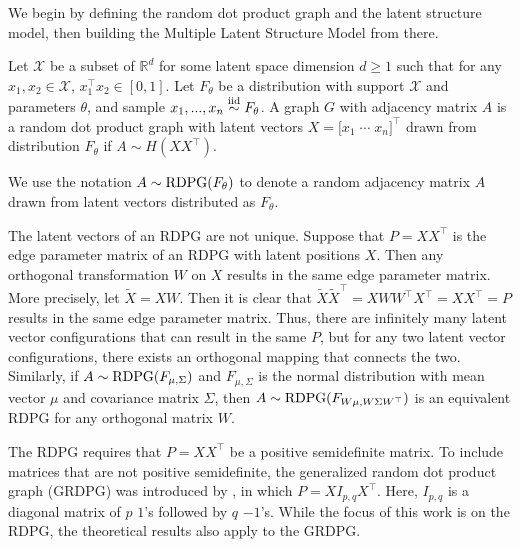 \documentclass[12pt]{article}
\begin{document}
We begin by defining the random dot product graph and the latent
structure model, then building the Multiple Latent Structure Model from
there.

\begin{definition}
\label{def:rdpg}
Let $\mathcal{X}$ be a subset of $\mathbb{R}^d$ for some latent space dimension $d \geq 1$ such that for any $x_1, x_2 \in \mathcal{X}$, $x_1^\top x_2 \in [0, 1]$. 
Let $F_\theta$ be a distribution with support $\mathcal{X}$ and parameters $\theta$, and sample $x_1, ..., x_n \stackrel{\mathrm{iid}}{\sim} F_\theta$. 
A graph $G$ with adjacency matrix $A$ is a random dot product graph with latent vectors $X = \bigl[x_1 \; \cdots \; x_n\bigr]^\top$ drawn from distribution $F_\theta$ if $A \sim H(X X^\top)$. 

We use the notation $A \sim \mathrm{RDPG}(F_\theta)$ to denote a random adjacency matrix $A$ drawn from latent vectors distributed as $F_\theta$. 
\end{definition}

\begin{remark}
\label{remark:nonunique}
The latent vectors of an RDPG are not unique. 
Suppose that $P = X X^\top$ is the edge parameter matrix of an RDPG with latent positions $X$. 
Then any orthogonal transformation $W$ on $X$ results in the same edge parameter matrix. 
More precisely, let $\tilde{X} = X W$. 
Then it is clear that $\tilde{X} \tilde{X}^\top = X W W^\top X^\top = X X^\top = P$ results in the same edge parameter matrix. 
Thus, there are infinitely many latent vector configurations that can result in the same $P$, but for any two latent vector configurations, there exists an orthogonal mapping that connects the two. 
Similarly, if $A \sim \mathrm{RDPG}(F_{\mu, \Sigma})$ and $F_{\mu, \Sigma}$ is the normal distribution with mean vector $\mu$ and covariance matrix $\Sigma$, then $A \sim \mathrm{RDPG}(F_{W \mu, W \Sigma W^\top})$ is an equivalent RDPG for any orthogonal matrix $W$. 
\end{remark}

\begin{remark}
\label{remark:grdpg}
The RDPG requires that $P = X X^\top$ be a positive semidefinite matrix. 
To include matrices that are not positive semidefinite, the generalized random dot product graph (GRDPG) was introduced by \citet{rubindelanchy2017statistical}, in which $P = X I_{p,q} X^\top$. 
Here, $I_{p,q}$ is a diagonal matrix of $p$ $1$'s followed by $q$ $-1$'s. 
While the focus of this work is on the RDPG, the theoretical results also apply to the GRDPG. 
\end{remark}
\end{document}

